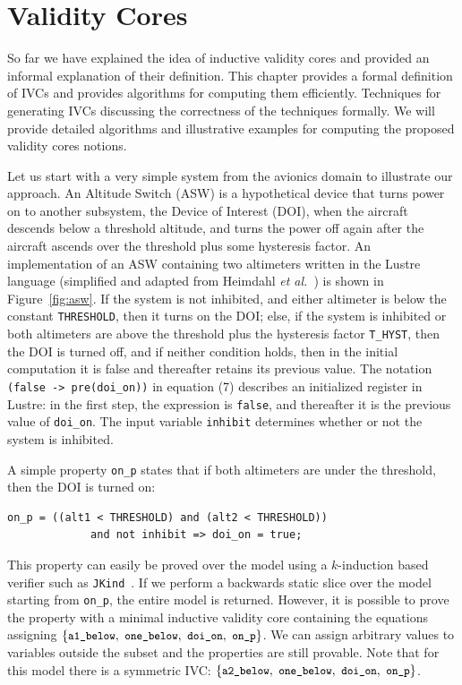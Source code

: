 \chapter{Validity Cores}
\label{ch:ivc}

So far we have explained the idea of inductive validity cores and provided an informal explanation of their definition. This chapter provides a formal definition of IVCs and provides algorithms for computing them efficiently. Techniques for generating IVCs discussing the correctness of the techniques formally. We will provide detailed algorithms and illustrative examples for computing the proposed validity cores notions.

Let us start with a very simple system from the avionics domain to illustrate our approach. An Altitude Switch (ASW) is a hypothetical device that turns power on to another subsystem, the Device of Interest (DOI), when the aircraft descends below a threshold altitude, and turns the power off again after the aircraft ascends over the threshold plus some hysteresis factor.  An implementation of an ASW containing two altimeters written in the Lustre language (simplified and adapted from Heimdahl \textit{et al.}~\cite{HCW02:ase-deviation}) is shown in Figure~\ref{fig:asw}.  If the system is not inhibited, and either altimeter is below the constant {\small \texttt{THRESHOLD}}, then it turns on the DOI; else, if the system is inhibited or both altimeters are above the threshold plus the hysteresis factor {\small \texttt{T\_HYST}}, then the DOI is turned off, and if neither condition holds, then in the initial computation it is false and thereafter retains its previous value.  The notation {\small \texttt{(false -> pre(doi\_on))}} in equation (7) describes an initialized register in Lustre: in the first step, the expression is {\small \texttt{false}}, and thereafter it is the previous value of {\small \texttt{doi\_on}}. The input variable {\small\texttt{inhibit}} determines whether or not the system is inhibited.

A simple property {\small \texttt{on\_p}} states that if both altimeters are under the threshold, then the DOI is turned on:
{\smaller
\begin{verbatim}
on_p = ((alt1 < THRESHOLD) and (alt2 < THRESHOLD))
             and not inhibit => doi_on = true;
\end{verbatim}
}
\noindent This property can easily be proved over the model using a $k$-induction based verifier such as \texttt{JKind}~\cite{jkind}.
If we perform a backwards static slice over the model starting from {\small \texttt{on\_p}}, the entire model is returned.  However, it is possible to prove the property with a minimal inductive validity core containing the equations assigning $\{ { \small \texttt{a1\_below},~\texttt{one\_below}, ~\texttt{doi\_on},~\texttt{on\_p}}\}$. We can assign arbitrary values to variables outside the subset and the properties are still provable.  Note that for this model there is a symmetric IVC: $\{ {\small \texttt{a2\_below},~\texttt{one\_below}, ~\texttt{doi\_on},~\texttt{on\_p}}\}$.

